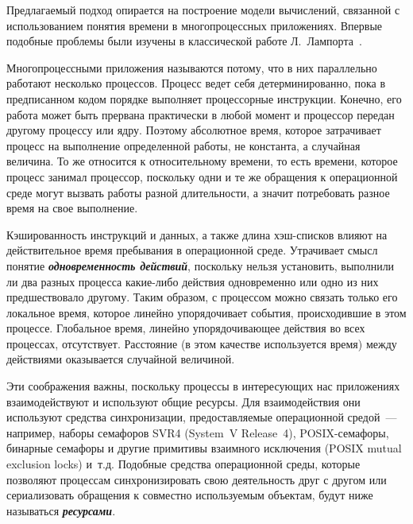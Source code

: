 \begin{multicols}{2}
{\nwt

Предлагаемый подход опирается на построение модели вычислений, связанной с 
использованием понятия времени в многопроцессных приложениях. Впервые подобные 
проблемы были изучены в классической работе Л.~Лампорта~\cite{8zak}.

Многопроцессными приложения называются потому, что в них параллельно
работают не\-сколь\-ко процессов. Процесс ведет \mbox{себя} детерминированно, пока в
предписанном кодом порядке выполняет процессорные инст\-рук\-ции. Конечно,
его работа может быть прервана практически в любой момент и процессор
передан другому процессу или ядру. Поэтому абсолютное время, которое
затрачивает процесс на выполнение определенной работы, не  константа, а
случайная  величина. То же  относится к относительному времени, то есть
времени, которое процесс занимал процессор,  поскольку одни и те же
обращения к операционной среде могут вызвать работы разной длительности, а
значит потребовать разное время на свое выполнение.
{ %

}

Кэшированность инструкций и данных, а также длина хэш-списков влияют
на действительное время пребывания в операционной  среде. Утрачивает смысл
понятие {\bfseries\textit{одно\-вре\-мен\-ность действий}}, поскольку  нельзя установить,
выполнили ли два разных процесса какие-либо действия одновременно или
одно из них предшествовало другому. Таким образом, с процессом можно
связать только его локальное время, которое линейно упорядочивает события,
происходившие в этом процессе.  Глобальное время, линейно
упо\-ря\-до\-чи\-ва\-ющее
 действия во всех процессах, отсутствует. Расстояние (в этом
качестве используется время) между действиями оказывается случайной
величиной.
{ %

}

Эти соображения важны, поскольку процессы в интересующих нас приложениях 
взаимодействуют и используют общие ресурсы. Для взаимодействия они используют 
средства синхронизации, предоставляемые операционной средой~--- например, 
набо\-ры семафоров SVR4 (System~V Release~4), POSIX-се\-ма\-фо\-ры, бинарные 
семафоры и другие примитивы взаимного исключения (POSIX mutual exclusion locks) 
и~т.д. Подобные средства операционной среды, которые позволяют процессам 
синхронизировать свою деятельность друг с другом или сериализовать обращения к 
совместно ис\-поль\-зу\-емым объектам,  будут ниже  называться 
{\bfseries\textit{ресурсами}}.

}
\end{multicols}
